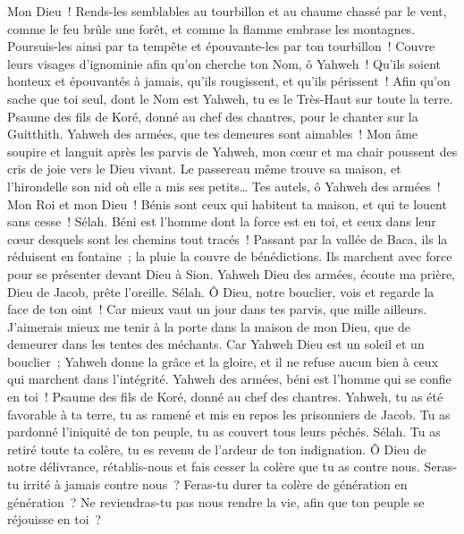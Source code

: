 \begin{multicols}{2}
Mon Dieu~! Rends-les semblables au tourbillon et au chaume chassé par le vent,
comme le feu brûle une forêt, et comme la flamme embrase les montagnes.
Poursuis-les ainsi par ta tempête et épouvante-les par ton tourbillon~!
Couvre leurs visages d'ignominie afin qu'on cherche ton Nom, ô Yahweh~!
Qu'ils soient honteux et épouvantés à jamais, qu'ils rougissent, et qu'ils périssent~!
Afin qu'on sache que toi seul, dont le Nom est Yahweh, tu es le Très-Haut sur toute la terre.
\VerseOne{}Psaume des fils de Koré, donné au chef des chantres, pour le chanter sur la Guitthith.
Yahweh des armées, que tes demeures sont aimables~!
Mon âme soupire et languit après les parvis de Yahweh, mon cœur et ma chair poussent des cris de joie vers le Dieu vivant.
Le passereau même trouve sa maison, et l'hirondelle son nid où elle a mis ses petits… Tes autels, ô Yahweh des armées~! Mon Roi et mon Dieu~!
Bénis sont ceux qui habitent ta maison, et qui te louent sans cesse~! Sélah.
Béni est l'homme dont la force est en toi, et ceux dans leur cœur desquels sont les chemins tout tracés~!
Passant par la vallée de Baca, ils la réduisent en fontaine~; la pluie la couvre de bénédictions.
Ils marchent avec force pour se présenter devant Dieu à Sion.
Yahweh Dieu des armées, écoute ma prière, Dieu de Jacob, prête l'oreille. Sélah.
Ô Dieu, notre bouclier, vois et regarde la face de ton oint~!
Car mieux vaut un jour dans tes parvis, que mille ailleurs. J'aimerais mieux me tenir à la porte dans la maison de mon Dieu, que de demeurer dans les tentes des méchants.
Car Yahweh Dieu est un soleil et un bouclier~; Yahweh donne la grâce et la gloire, et il ne refuse aucun bien à ceux qui marchent dans l'intégrité.
Yahweh des armées, béni est l'homme qui se confie en toi~!
\VerseOne{}Psaume des fils de Koré, donné au chef des chantres.
Yahweh, tu as été favorable à ta terre, tu as ramené et mis en repos les prisonniers de Jacob.
Tu as pardonné l'iniquité de ton peuple, tu as couvert tous leurs péchés. Sélah.
Tu as retiré toute ta colère, tu es revenu de l'ardeur de ton indignation.
Ô Dieu de notre délivrance, rétablis-nous et fais cesser la colère que tu as contre nous.
Seras-tu irrité à jamais contre nous~? Feras-tu durer ta colère de génération en génération~?
Ne reviendras-tu pas nous rendre la vie, afin que ton peuple se réjouisse en toi~?

\end{multicols}
